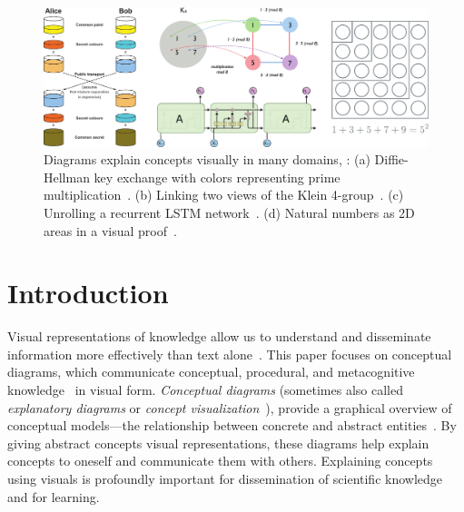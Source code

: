 \begin{figure}[h]
  \centering
  \includegraphics[width=\textwidth]{assets/interviews/teaser-a.pdf}
  \caption{
      Diagrams explain concepts visually in many domains, \eg{}: (a) Diffie-Hellman key exchange with colors representing prime multiplication~\cite{wiki:crypto}. (b) Linking two views of the Klein 4-group~\cite{OBT}. (c) Unrolling a recurrent LSTM network~\cite{UnderstandLSTM}. (d) Natural numbers as 2D areas in a visual proof~\cite{SystemsOfThought}.
  }
  \label{fig:interviews-teaser}
\end{figure}

\section{Introduction}

Visual representations of knowledge allow us to understand and disseminate information more effectively than text alone~\cite{promiseOfMultimediaLearning}. This paper focuses on conceptual diagrams, which communicate conceptual, procedural, and metacognitive knowledge~\cite{bloomRevised} in visual form. \emph{Conceptual diagrams} (sometimes also called \emph{explanatory diagrams} or \emph{concept visualization}~\cite{conceptViz}), provide a graphical overview of conceptual models---the relationship between concrete and abstract entities~\cite{infographics}. By giving abstract concepts visual representations, these diagrams help explain concepts to oneself and communicate them with others. Explaining concepts using visuals is profoundly important for dissemination of scientific knowledge and for learning. 



